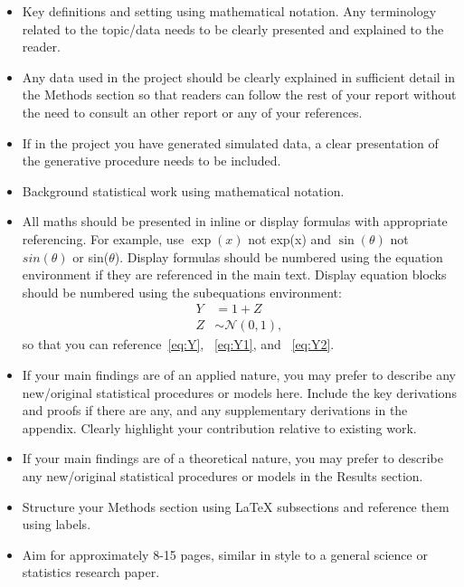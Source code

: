 \documentclass{statsmsc}
\begin{document}
\begin{itemize}
    \item Key definitions and setting using mathematical notation. Any terminology related to the topic/data needs to be clearly presented and explained to the reader.
    \item Any data used in the project should be clearly explained in sufficient detail in the Methods section so that readers can follow the rest of your report without the need to consult an other report or any of your references.
    \item If in the project you have generated simulated data, a clear presentation of the generative procedure needs to be included. 
    \item Background statistical work using mathematical notation.
    \item All maths should be presented in inline or display formulas with appropriate referencing. For example, use $\exp(x)$ not exp(x) and $\sin(\theta)$ not $sin(\theta)$ or sin($\theta$). Display formulas should be numbered using the equation environment if they are referenced in the main text. Display equation blocks should be numbered using the subequations environment:
\begin{subequations}\label{eq:Y}
    \begin{align}
        Y & = 1 + Z \label{eq:Y1} \\ 
        Z & \sim \mathcal{N}(0,1) \label{eq:Y2},
    \end{align}
\end{subequations}
    so that you can reference~\eqref{eq:Y}, ~\eqref{eq:Y1}, and ~\eqref{eq:Y2}.
    \item If your main findings are of an applied nature, you may prefer to describe any new/original statistical procedures or models here. Include the key derivations and proofs if there are any, and any supplementary derivations in the appendix. Clearly highlight your contribution relative to existing work. 
    \item If your main findings are of a theoretical nature, you may prefer to describe any new/original statistical procedures or models in the Results section.
    \item Structure your Methods section using LaTeX   subsections and reference them using labels.
    \item Aim for approximately 8-15 pages, similar in style to a general science or statistics research paper.
\end{itemize}
\end{document}
